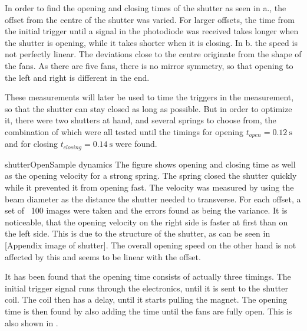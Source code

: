 
In order to find the opening and closing times of the shutter as seen in a., the offset from the centre of the shutter was varied. For larger offsets, the time from the initial trigger until a signal in the photodiode was received takes longer when the shutter is opening, while it takes shorter when it is closing.
In b. the speed is not perfectly linear. The deviations close to the centre originate from the shape of the fans. As there are five fans, there is no mirror symmetry, so that opening to the left and right is different in the end.

These measurements will later be used to time the triggers in the measurement, so that the shutter can stay closed as long as possible. But in order to optimize it, there were two shutters at hand, and several springs to choose from, the combination of which were all tested until the timings for opening $t_{open}=\SI{0.12}{\second}$ and for closing $t_{closing}=\SI{0.14}{\second}$ were found.

\pltCustom{
	\begin{center}
		
		
	\end{center}
}
{shutterOpen}{Sample dynamics}{
	The figure shows opening and closing time as well as the opening velocity for a strong spring. The spring closed the shutter quickly while it prevented it from opening fast.
	The velocity was measured by using the beam diameter as the distance the shutter needed to transverse. For each offset, a set of ~100 images were taken and the errors found as being the variance. It is noticeable, that the opening velocity on the right side is faster at first than on the left side. This is due to the structure of the shutter, as can be seen in [Appendix image of shutter].
	The overall opening speed on the other hand is not affected by this and seems to be linear with the offset.
}

It has been found that the opening time consists of actually three timings. The initial trigger signal runs through the electronics, until it is sent to the shutter coil. The coil then has a delay, until it starts pulling the magnet. The opening time is then found by also adding the time until the fans are fully open. This is also shown in .

